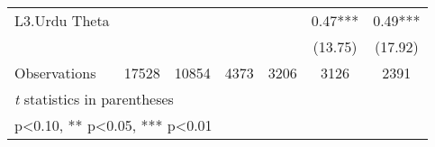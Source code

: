 \begin{sidewaystable}[htbp]
\begin{tabular}{l*{6}{c}}
L3.Urdu Theta   &            &            &            &            &     0.47***&     0.49***\\
                &            &            &            &            &  (13.75)   &  (17.92)   \\
\midrule
Observations    &    17528   &    10854   &     4373   &     3206   &     3126   &     2391   \\
\bottomrule
\multicolumn{7}{l}{\footnotesize \textit{t} statistics in parentheses}\\
\multicolumn{7}{l}{\footnotesize * p<0.10, ** p<0.05, *** p<0.01}\\
\end{tabular}
\end{sidewaystable}

